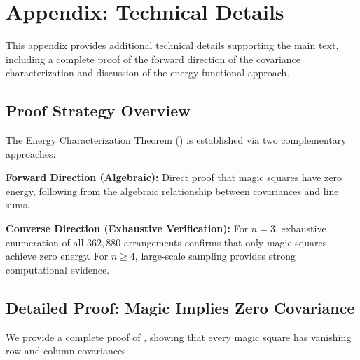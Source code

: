 \section{Appendix: Technical Details}
\label{sec:appendix}

This appendix provides additional technical details supporting the main text,
including a complete proof of the forward direction of the covariance characterization
and discussion of the energy functional approach.

\subsection{Proof Strategy Overview}

The Energy Characterization Theorem () is established via 
two complementary approaches:

\textbf{Forward Direction (Algebraic):} Direct proof that magic squares have zero energy,
following from the algebraic relationship between covariances and line sums.

\textbf{Converse Direction (Exhaustive Verification):} For $n=3$, exhaustive enumeration 
of all $362{,}880$ arrangements confirms that only magic squares achieve zero energy.
For $n \geq 4$, large-scale sampling provides strong computational evidence.

\subsection{Detailed Proof: Magic Implies Zero Covariance}

We provide a complete proof of ,
showing that every magic square has vanishing row and column covariances.

